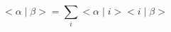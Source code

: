 \begin{equation}         
         <\alpha \mid \beta>=\sum_{i}^{}<\alpha \mid i><i \mid \beta>             
\end{equation}


